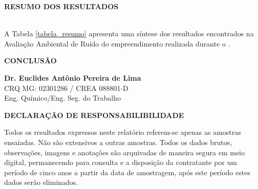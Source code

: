 
\newpage
\begin{SingleSpace}

\textbf{RESUMO DOS RESULTADOS}
 \\

A Tabela \ref{tabela_resumo} apresenta uma síntese dos resultados encontrados na Avaliação Ambiental de Ruído do empreendimento \textbf{} realizada durante o \textbf{}.


\end{SingleSpace}

\newpage

\begin{SingleSpace}

\textbf{CONCLUSÃO}



\end{SingleSpace}

\begin{center}
\begin{scriptsize}
\textbf{Dr. Euclides Antônio Pereira de Lima} \\
CRQ MG: 02301286 / CREA 088801-D \\
Eng. Químico/Eng. Seg. do Trabalho \\
\end{scriptsize}
\end{center}

\begin{SingleSpace}
	
\textbf{DECLARAÇÃO DE RESPONSABILIBILIDADE}

Todos os resultados expressos neste relatório referem-se apenas as amostras ensaiadas. Não são extensivos a outras amostras.
Todos os dados brutos, observações, imagens e anotações são arquivadas de maneira segura em meio digital, permanecendo para consulta e a disposição da contratante por um período de cinco anos a partir da data de amostragem, após este período estes dados serão eliminados.

\end{SingleSpace}




